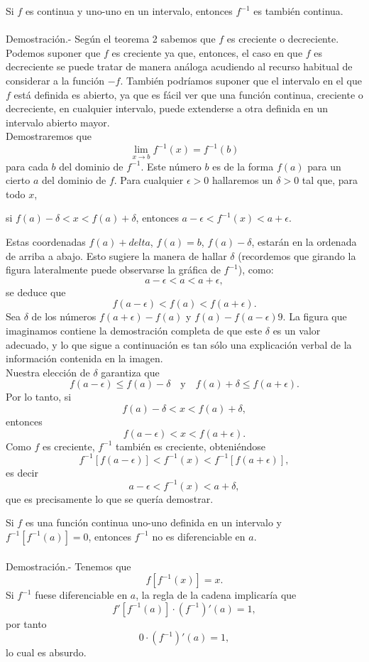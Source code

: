 \begin{teo}
    Si $f$ es continua y uno-uno en un intervalo, entonces $f^{-1}$ es también continua.\\\\
	Demostración.-\; Según el teorema 2 sabemos que $f$ es creciente o decreciente. Podemos suponer que $f$ es creciente ya que, entonces, el caso en que $f$ es decreciente se puede tratar de manera análoga acudiendo al recurso habitual de considerar a la función $-f$. También podríamos suponer que el intervalo en el que $f$ está definida es abierto, ya que es fácil ver que una función continua, creciente o decreciente, en cualquier intervalo, puede extenderse a otra definida en un intervalo abierto mayor.\\
	Demostraremos que 
	$$\lim_{x\to b}f^{-1}(x)=f^{-1}(b)$$
	para cada $b$ del dominio de $f^{-1}$. Este número $b$ es de la forma $f(a)$ para un cierto $a$ del dominio de $f$. Para cualquier $\epsilon>0$
	hallaremos un $\delta>0$ tal que, para todo $x$,
	\begin{center}
	si $f(a)-\delta<x<f(a)+\delta$, entonces $a-\epsilon < f^{-1}(x) < a+\epsilon.$
	\end{center}
	Estas coordenadas $f(a)+delta$, $f(a)=b$, $f(a)-\delta$, estarán en la ordenada de arriba a abajo. Esto sugiere la manera de hallar $\delta$ (recordemos que girando la figura lateralmente puede observarse la gráfica de $f^{-1}$), como:
	$$a-\epsilon<a<a+\epsilon,$$
	se deduce que 
	$$f(a-\epsilon)<f(a)<f(a+\epsilon).$$
	Sea $\delta$ de los números $f(a+\epsilon)-f(a)$ y $f(a)-f(a-\epsilon)9$. La figura que imaginamos contiene la demostración completa de que este $\delta$ es un valor adecuado, y lo que sigue a continuación es tan sólo una explicación verbal de la información contenida en la imagen. \\
	Nuestra elección de $\delta$ garantiza que
	$$f(a-\epsilon)\leq f(a)-\delta \quad \mbox{y}\quad f(a)+\delta \leq f(a+\epsilon).$$
	Por lo tanto, si
	$$f(a)-\delta <x< f(a)+\delta,$$
	entonces
	$$f(a-\epsilon)<x<f(a+\epsilon).$$
	Como $f$ es creciente, $f^{-1}$ también es creciente, obteniéndose
	$$f^{-1}\left[f(a-\epsilon)\right]<f^{-1}(x)<f^{-1}\left[f(a+\epsilon)\right],$$
	es decir
	$$a-\epsilon<f^{-1}(x)<a+\delta,$$
	que es precisamente lo que se quería demostrar.
\end{teo}

\begin{teo}
    Si $f$ es una función continua uno-uno definida en un intervalo y $f^{-1}\left[f^{-1}(a)\right]=0$, entonces $f^{-1}$ no es diferenciable en $a$.\\\\
	Demostración.-\; Tenemos que
	$$f\left[f^{-1}(x)\right]=x.$$
	Si $f^{-1}$ fuese diferenciable en $a$, la regla de la cadena implicaría que
	$$f'\left[f^{-1}(a)\right]\cdot\left(f^{-1}\right)'(a)=1,$$
	por tanto
	$$0\cdot\left(f^{-1}\right)'(a)=1,$$
	lo cual es absurdo.
\end{teo}

